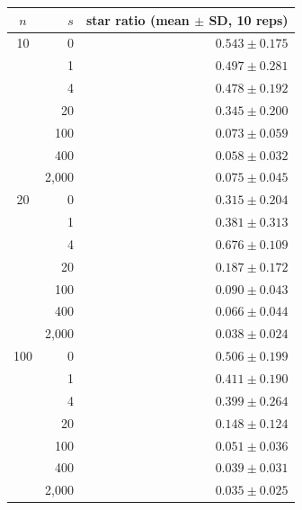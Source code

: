 \begin{tabular}{crr}
\toprule
$n$ & $s$ & star ratio (mean $\pm$ SD, 10 reps) \\
\midrule
10 & 0 & $0.543\pm0.175$ \\
 & 1 & $0.497\pm0.281$ \\
 & 4 & $0.478\pm0.192$ \\
 & 20 & $0.345\pm0.200$ \\
 & 100 & $0.073\pm0.059$ \\
 & 400 & $0.058\pm0.032$ \\
 & 2{,}000 & $0.075\pm0.045$ \\
20 & 0 & $0.315\pm0.204$ \\
 & 1 & $0.381\pm0.313$ \\
 & 4 & $0.676\pm0.109$ \\
 & 20 & $0.187\pm0.172$ \\
 & 100 & $0.090\pm0.043$ \\
 & 400 & $0.066\pm0.044$ \\
 & 2{,}000 & $0.038\pm0.024$ \\
100 & 0 & $0.506\pm0.199$ \\
 & 1 & $0.411\pm0.190$ \\
 & 4 & $0.399\pm0.264$ \\
 & 20 & $0.148\pm0.124$ \\
 & 100 & $0.051\pm0.036$ \\
 & 400 & $0.039\pm0.031$ \\
 & 2{,}000 & $0.035\pm0.025$ \\
\bottomrule
\end{tabular}

